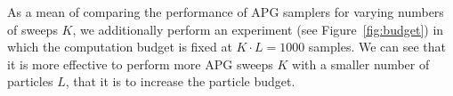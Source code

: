 \documentclass[anonymous=false, %
               format=acmsmall, %
               review=true, %
               screen=true, %
               nonacm=true]{acmart}
\theoremstyle{definition}
\begin{document}
As a mean of comparing the performance of APG samplers for varying numbers of sweeps $K$, we additionally perform an experiment (see Figure~\ref{fig:budget}) in which the computation budget is fixed at $K \cdot L = 1000$ samples. We can see that it is more effective to perform more APG sweeps $K$ with a smaller number of particles $L$, that it is to increase the particle budget. 


\end{document}
